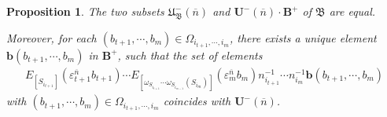 \documentclass[12pt]{amsart}
\newtheorem{proposition}[theorem]{Proposition}
\begin{document}
\begin{proposition}
    The two subsets $\mathfrak{U}^-_{\mathfrak{B}}(\overline{n})$ and $\mathbf{U}^-(\overline{n})\cdot \mathbf{B}^+$ of $\mathfrak{B}$ are equal.

    Moreover, for each $(b_{t+1},\cdots,b_m)\in \Omega_{i_{t+1},\cdots,i_m}$, there exists a unique element $\mathbf{b}(b_{t+1},\cdots,b_m)$ in $\mathbf{B}^+$, such that the set of elements
    \begin{align*}
        E_{[S_{i_{t+1}}]}(\varepsilon_{t+1}^{\overline{n}}b_{t+1})  \cdots E_{[\omega_{S_{i_{t+1}}}\cdots\omega_{S_{i_{m-1}}}(S_{i_m})]}(\varepsilon_m^{\overline{n}}b_m)n_{i_{t+1}}^{-1}\cdots n_{i_m}^{-1} \mathbf{b}(b_{t+1},\cdots,b_m) 
    \end{align*}
    with $ (b_{t+1},\cdots,b_m)\in \Omega_{i_{t+1},\cdots,i_m} $ coincides with $\mathbf{U}^-(\overline{n})$.
\end{proposition}
\end{document}
